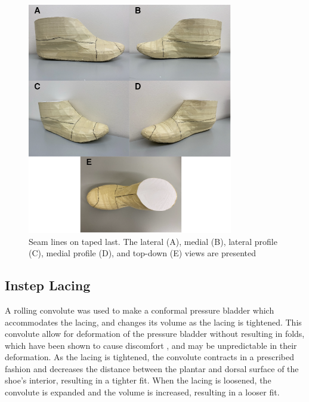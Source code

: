 \documentclass[defaultstyle,11pt]{thesis}
\begin{document}
\begin{figure}
\hypertarget{fig:SA3-lasttape}{%
\centering
\includegraphics[width=0.8\textwidth,height=\textheight]{../fig/SA3/Last_Taping_Seams.png}
\caption{Seam lines on taped last. The lateral (A), medial (B), lateral profile (C), medial profile (D), and top-down (E) views are presented}\label{fig:SA3-lasttape}
}
\end{figure}

\hypertarget{instep-lacing}{%
\subsection{Instep Lacing}\label{instep-lacing}}

A rolling convolute was used to make a conformal pressure bladder which accommodates the lacing, and changes its volume as the lacing is tightened.
This convolute allow for deformation of the pressure bladder without resulting in folds, which have been shown to cause discomfort \citep{Chappell2017}, and may be unpredictable in their deformation.
As the lacing is tightened, the convolute contracts in a prescribed fashion and decreases the distance between the plantar and dorsal surface of the shoe's interior, resulting in a tighter fit.
When the lacing is loosened, the convolute is expanded and the volume is increased, resulting in a looser fit.
\end{document}
